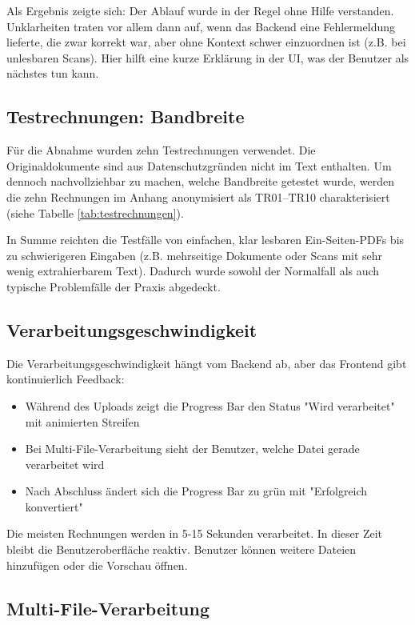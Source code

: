Als Ergebnis zeigte sich: Der Ablauf wurde in der Regel ohne Hilfe verstanden. Unklarheiten traten vor allem dann auf, wenn das Backend eine Fehlermeldung lieferte, die zwar korrekt war, aber ohne Kontext schwer einzuordnen ist (z.B. bei unlesbaren Scans). Hier hilft eine kurze Erklärung in der UI, was der Benutzer als nächstes tun kann.

\subsection{Testrechnungen: Bandbreite}
Für die Abnahme wurden zehn Testrechnungen verwendet. Die Originaldokumente sind aus Datenschutzgründen nicht im Text enthalten. Um dennoch nachvollziehbar zu machen, welche Bandbreite getestet wurde, werden die zehn Rechnungen im Anhang anonymisiert als TR01--TR10 charakterisiert (siehe Tabelle \ref{tab:testrechnungen}).

In Summe reichten die Testfälle von einfachen, klar lesbaren Ein-Seiten-PDFs bis zu schwierigeren Eingaben (z.B. mehrseitige Dokumente oder Scans mit sehr wenig extrahierbarem Text). Dadurch wurde sowohl der Normalfall als auch typische Problemfälle der Praxis abgedeckt.

\subsection{Verarbeitungsgeschwindigkeit}

Die Verarbeitungsgeschwindigkeit hängt vom Backend ab, aber das Frontend gibt kontinuierlich Feedback:

\begin{itemize}
    \item Während des Uploads zeigt die Progress Bar den Status "Wird verarbeitet" mit animierten Streifen
    \item Bei Multi-File-Verarbeitung sieht der Benutzer, welche Datei gerade verarbeitet wird
    \item Nach Abschluss ändert sich die Progress Bar zu grün mit "Erfolgreich konvertiert"
\end{itemize}

Die meisten Rechnungen werden in 5-15 Sekunden verarbeitet. In dieser Zeit bleibt die Benutzeroberfläche reaktiv. Benutzer können weitere Dateien hinzufügen oder die Vorschau öffnen.

\subsection{Multi-File-Verarbeitung}

